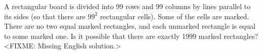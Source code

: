 \problem
A rectangular board is divided into 99 rows and 99 columns by lines parallel to
its sides (so that there are $99 ^ 2$ rectangular cells).
Some of the cells are marked.
There are no two equal marked rectangles, and each unmarked rectangle is equal
to some marked one.
Is it possible that there are exactly 1999 marked rectangles?
\solution
<FIXME: Missing English solution.>
\endproblem
